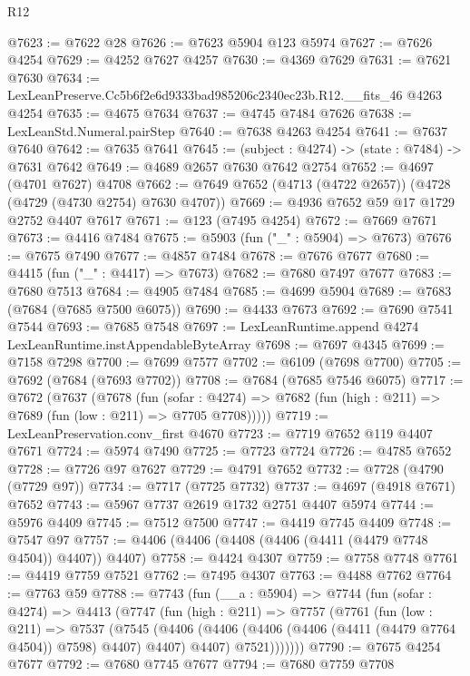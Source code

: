 \begin{lexlean}{R12}
\begin{coremodule}
@7623 := @7622 @28
@7626 := @7623 @5904 @123 @5974
@7627 := @7626 @4254
@7629 := @4252 @7627 @4257
@7630 := @4369 @7629
@7631 := @7621 @7630
@7634 := LexLeanPreserve.Cc5b6f2e6d9333bad985206c2340ec23b.R12.__fits_46 @4263 @4254
@7635 := @4675 @7634
@7637 := @4745 @7484 @7626
@7638 := LexLeanStd.Numeral.pairStep
@7640 := @7638 @4263 @4254
@7641 := @7637 @7640
@7642 := @7635 @7641
@7645 := (subject : @4274) -> (state : @7484) -> @7631 @7642
@7649 := @4689 @2657 @7630 @7642 @2754
@7652 := @4697 (@4701 @7627) @4708
@7662 := @7649 @7652 (@4713 (@4722 @2657)) (@4728 (@4729 (@4730 @2754) @7630 @4707))
@7669 := @4936 @7652 @59 @17 @1729 @2752 @4407 @7617
@7671 := @123 (@7495 @4254)
@7672 := @7669 @7671
@7673 := @4416 @7484
@7675 := @5903 (fun ("_" : @5904) => @7673)
@7676 := @7675 @7490
@7677 := @4857 @7484
@7678 := @7676 @7677
@7680 := @4415 (fun ("_" : @4417) => @7673)
@7682 := @7680 @7497 @7677
@7683 := @7680 @7513
@7684 := @4905 @7484
@7685 := @4699 @5904
@7689 := @7683 (@7684 (@7685 @7500 @6075))
@7690 := @4433 @7673
@7692 := @7690 @7541 @7544
@7693 := @7685 @7548
@7697 := LexLeanRuntime.append @4274 LexLeanRuntime.instAppendableByteArray
@7698 := @7697 @4345
@7699 := @7158 @7298
@7700 := @7699 @7577
@7702 := @6109 (@7698 @7700)
@7705 := @7692 (@7684 (@7693 @7702))
@7708 := @7684 (@7685 @7546 @6075)
@7717 := @7672
    (@7637
      (@7678
        (fun (sofar : @4274) =>
        @7682 (fun (high : @211) => @7689 (fun (low : @211) => @7705 @7708)))))
@7719 := LexLeanPreservation.conv_first @4670
@7723 := @7719 @7652 @119 @4407 @7671
@7724 := @5974 @7490
@7725 := @7723 @7724
@7726 := @4785 @7652
@7728 := @7726 @97 @7627
@7729 := @4791 @7652
@7732 := @7728 (@4790 (@7729 @97))
@7734 := @7717 (@7725 @7732)
@7737 := @4697 (@4918 @7671) @7652
@7743 := @5967 @7737 @2619 @1732 @2751 @4407 @5974
@7744 := @5976 @4409
@7745 := @7512 @7500
@7747 := @4419 @7745 @4409
@7748 := @7547 @97
@7757 := @4406 (@4406 (@4408 (@4406 (@4411 (@4479 @7748 @4504)) @4407)) @4407)
@7758 := @4424 @4307
@7759 := @7758 @7748
@7761 := @4419 @7759 @7521
@7762 := @7495 @4307
@7763 := @4488 @7762
@7764 := @7763 @59
@7788 := @7743
    (fun (__a : @5904) =>
    @7744
      (fun (sofar : @4274) =>
      @4413
        (@7747
          (fun (high : @211) =>
          @7757
            (@7761
              (fun (low : @211) =>
              @7537
                (@7545
                  (@4406
                    (@4406 (@4406 (@4406 (@4411 (@4479 @7764 @4504)) @7598) @4407) @4407)
                    @4407)
                  @7521)))))))
@7790 := @7675 @4254 @7677
@7792 := @7680 @7745 @7677
@7794 := @7680 @7759 @7708

\end{coremodule}
\end{lexlean}
